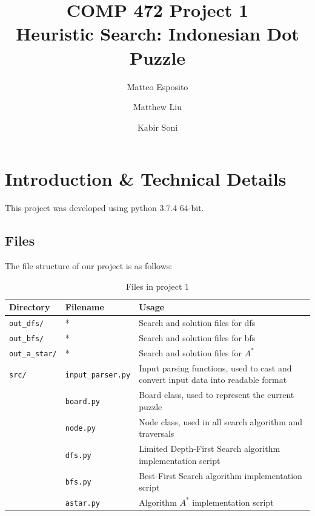 \documentclass[runningheads]{llncs}
\begin{document}
\title{COMP 472 Project 1 \\ Heuristic Search: Indonesian Dot Puzzle}

\author{Matteo Esposito \and
Matthew Liu \and
Kabir Soni}



\maketitle   

\section{Introduction \& Technical Details}

This project was developed using python 3.7.4 64-bit.

\subsection{Files}

The file structure of our project is as follows:

\begin{table}
    \centering
    \caption{Files in project 1}\label{tab0}
    \begin{tabularx}{\textwidth}{|l|l|X|}
        \hline
        \textbf{Directory} & \textbf{Filename} & \textbf{Usage} \\ \hline
        \verb|out_dfs/| & * & Search and solution files for dfs \\ \hline
        \verb|out_bfs/| & * & Search and solution files for bfs \\ \hline
        \verb|out_a_star/| & * & Search and solution files for $A^{*}$ \\ \hline
        \verb|src/| & \verb|input_parser.py| & Input parsing functions, used to cast and convert input data into readable format \\ \hline
        & \verb|board.py| & Board class, used to represent the current puzzle\\ \hline
        & \verb|node.py| & Node class, used in all search algorithm and traversals \\ \hline
        & \verb|dfs.py| & Limited Depth-First Search algorithm implementation script \\ \hline
        & \verb|bfs.py| & Best-First Search algorithm implementation script \\ \hline
        & \verb|astar.py| & Algorithm $A^{*}$ implementation script \\ \hline
    \end{tabularx}
\end{table}
\end{document}
